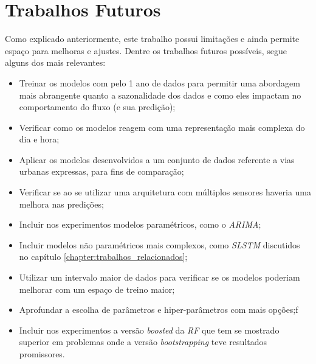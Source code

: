 \section{Trabalhos Futuros}

Como explicado anteriormente, este trabalho possui limitações e ainda permite espaço para melhoras e ajustes. Dentre os trabalhos futuros possíveis, segue alguns dos mais relevantes:

\begin{itemize}
    \item Treinar os modelos com pelo 1 ano de dados para permitir uma abordagem mais abrangente quanto a sazonalidade dos dados e como eles impactam no comportamento do fluxo (e sua predição);
    \item Verificar como os modelos reagem com uma representação mais complexa do dia e hora;
    \item Aplicar os modelos desenvolvidos a um conjunto de dados referente a vias urbanas expressas, para fins de comparação;
    \item Verificar se ao se utilizar uma arquitetura com múltiplos sensores haveria uma melhora nas predições;
    \item Incluir nos experimentos modelos paramétricos, como o \textit{\acrshort{ARIMA}};
    \item Incluir modelos não paramétricos mais complexos, como \textit{\acrshort{SLSTM}} discutidos no capítulo \ref{chapter:trabalhos_relacionados};
    \item Utilizar um intervalo maior de dados para verificar se os modelos poderiam melhorar com um espaço de treino maior;
    \item Aprofundar a escolha de parâmetros e hiper-parâmetros com mais opções;f
    \item Incluir nos experimentos a versão \textit{boosted} da \textit{\acrshort{RF}} que tem se mostrado superior em problemas onde a versão \textit{bootstrapping} teve resultados promissores.
\end{itemize}